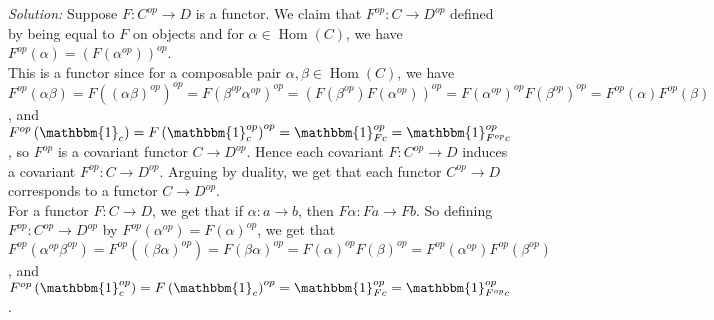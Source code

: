 \documentclass[a4paper]{article}
\theoremstyle{plain}%
\theoremstyle{definition}
\theoremstyle{remark}
\DeclareMathOperator{\Hom}{Hom}
\begin{document}
\textit{Solution:}
Suppose $F  \colon C^{op} \to D$ is a functor. 
We claim that $F^{op}  \colon C \to D^{op}$ defined by
being equal to $F$ on objects and for $\alpha \in \Hom\left( C \right) $, we
have
$F^{op} \left( \alpha \right) = \left( F \left( \alpha^{op} \right) \right)^{op} $.\\
This is a functor since for a composable pair
$\alpha, \beta \in \Hom(C)$, we have
$F^{op} \left( \alpha \beta \right) 
= F\left( \left( \alpha \beta \right)^{op} \right)^{op} 
= F \left( \beta^{op} \alpha^{op} \right)^{op}
= \left( F\left( \beta^{op} \right) F\left( \alpha^{op} \right) \right)^{op}
= F\left( \alpha^{op} \right)^{op} F\left( \beta^{op} \right)^{op}
= F^{op}(\alpha) F^{op} (\beta)$, and
$F^{op} \left( \mathbbm{1}_c \right) 
= F \left( \mathbbm{1}_c^{op} \right)^{op}
= \mathbbm{1}_{F c}^{op}
= \mathbbm{1}_{F^{op} c}^{op}$, so
$F^{op}$ is a covariant functor $C \to D^{op}$. Hence
each covariant  $F  \colon C^{op} \to D$ induces a covariant
$F^{op}  \colon C \to D^{op}$. Arguing by duality, we get that each functor 
$C^{op} \to D$ corresponds to a functor $C \to D^{op}$.\\
\linebreak
For a functor $F  \colon C \to D$, we get that if $\alpha  \colon a \to b$,
then
$F \alpha  \colon Fa \to Fb$. So
defining $F^{op}  \colon C^{op} \to D^{op}$ by
$F^{op} \left( \alpha^{op} \right) =
F \left( \alpha \right)^{op}$, we get that
$F^{op} \left( \alpha^{op} \beta^{op} \right) 
= F^{op} \left( \left( \beta \alpha \right)^{op} \right) 
= F\left(  \beta \alpha \right)^{op}
= F\left( \alpha \right)^{op} F\left( \beta \right)^{op}
= F^{op} \left( \alpha^{op} \right) F^{op} \left( \beta^{op} \right) $, and
$F^{op} \left( \mathbbm{1}_{c}^{op} \right) 
= F\left( \mathbbm{1}_c \right)^{op}
= \mathbbm{1}_{F c}^{op}
= \mathbbm{1}_{F^{op} c}^{op}$.\\
\linebreak
\end{document}
